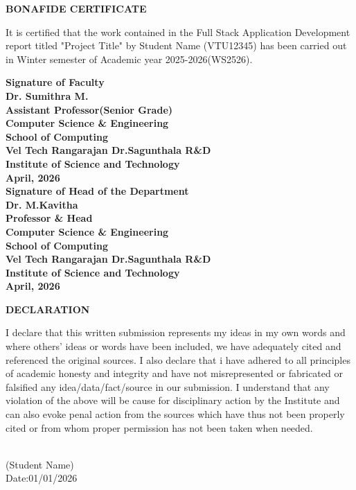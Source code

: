\documentclass[12pt]{report}
\begin{document}
\newpage 
{} 
\begin{center} 
{\Huge \textbf{ BONAFIDE CERTIFICATE}}\\[0.5cm] 
\end{center} 
\linespread{1.5} 
\large{It is certified that the work contained in the Full Stack Application Development \\report titled "Project Title" by Student Name (VTU12345) has been carried out in Winter semester of Academic year 2025-2026(WS2526).} 
\vspace{1.5cm} 
\begin{flushright} 
\textbf{Signature of Faculty\\Dr. Sumithra M.\\Assistant Professor(Senior Grade)\\Computer Science \& 
Engineering\\School of Computing\\Vel Tech Rangarajan Dr.Sagunthala R\&D\\Institute of Science and Technology\\April, 2026}\\[2.0cm] 
\textbf{Signature of Head of the Department\\Dr. M.Kavitha\\Professor \& Head\\Computer Science \& Engineering\\School of Computing\\Vel Tech Rangarajan Dr.Sagunthala R\&D\\Institute of Science and Technology\\April, 2026}\\  
\end{flushright} 
 
\newpage 
\begin{center} 
\Huge \textbf{DECLARATION} 
\end{center} 
\linespread{1.5} 
\large{ 
 I declare that this written submission represents my ideas in my own words and where others' ideas or words have been included, we have adequately cited and referenced the original sources. I also declare that i have adhered to all principles of academic honesty and integrity and have not misrepresented or fabricated or falsified any idea/data/fact/source in our submission. I understand that any violation of the above will be cause for disciplinary action by the Institute and can also evoke penal action from the sources which have thus not been properly cited or from whom proper permission has not been taken when needed.} 
\vspace{2.0cm} 
\begin{flushright} 
\\ 
\large{(Student Name)}\\ 
\large{Date:01/01/2026}\\[2.0cm] 
\\ 
\large{}\\ 
\large{}\\[2.0cm] 
\\ 
\large{}\\ 
\large{}\\[2.0cm] 
\end{flushright} 
\end{document}
